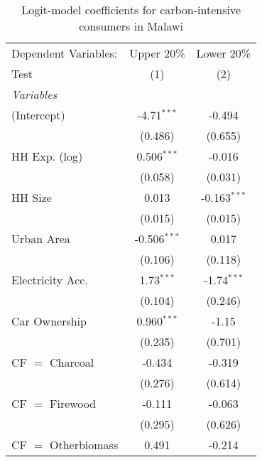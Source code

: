 
\begin{table}[htbp!]
   \centering
   \small
   \begin{adjustbox}{width = 1\textwidth, max height = 0.95\textheight, center}
      \begin{threeparttable}[b]
         \caption{\label{tab:Logit_1_MWI} Logit-model coefficients for carbon-intensive consumers in Malawi}
         \begin{tabular}{lcc}
            \tabularnewline \midrule \midrule
            Dependent Variables:  & Upper 20\%     & Lower 20\%\\   
            Test                  & (1)            & (2)\\  
            \midrule
            \emph{Variables}\\
            (Intercept)           & -4.71$^{***}$  & -0.494\\   
                                  & (0.486)        & (0.655)\\   
            HH Exp. (log)         & 0.506$^{***}$  & -0.016\\   
                                  & (0.058)        & (0.031)\\   
            HH Size               & 0.013          & -0.163$^{***}$\\   
                                  & (0.015)        & (0.015)\\   
            Urban Area            & -0.506$^{***}$ & 0.017\\   
                                  & (0.106)        & (0.118)\\   
            Electricity Acc.      & 1.73$^{***}$   & -1.74$^{***}$\\   
                                  & (0.104)        & (0.246)\\   
            Car Ownership         & 0.960$^{***}$  & -1.15\\   
                                  & (0.235)        & (0.701)\\   
            CF $=$ Charcoal       & -0.434         & -0.319\\   
                                  & (0.276)        & (0.614)\\   
            CF $=$ Firewood       & -0.111         & -0.063\\   
                                  & (0.295)        & (0.626)\\   
            CF $=$ Otherbiomass   & 0.491          & -0.214\\   

\end{tabular}
\end{threeparttable}
\end{adjustbox}
\end{table}
